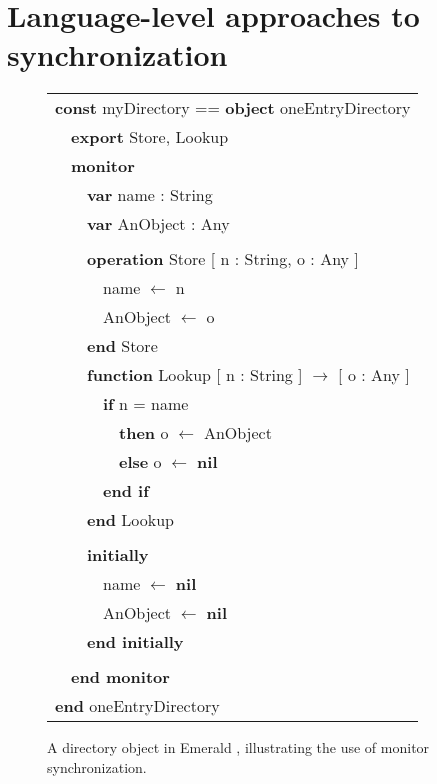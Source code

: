 \section{Language-level approaches to synchronization}
\begin{figure}
{\samepage\it\sis%
\begin{tabular}{l}%
{\bf const} myDirectory == {\bf object} oneEntryDirectory\\
~~{\bf export} Store, Lookup\\
~~{\bf monitor}\\
~~~~{\bf var} name : String\\
~~~~{\bf var} AnObject : Any\\
\\
~~~~{\bf operation} Store [ n : String, o : Any ]\\
~~~~~~name $\gets$ n\\
~~~~~~AnObject $\gets$ o\\
~~~~{\bf end} Store
\\
~~~~{\bf function} Lookup [ n : String ] $\to$ [ o : Any ]\\
~~~~~~{\bf if} n = name\\
~~~~~~~~{\bf then} o $\gets$ AnObject\\
~~~~~~~~{\bf else} o $\gets$ {\bf nil}\\
~~~~~~{\bf end if}\\
~~~~{\bf end} Lookup\\
\\
~~~~{\bf initially}\\
~~~~~~name $\gets$ {\bf nil}\\
~~~~~~AnObject $\gets$ {\bf nil}\\
~~~~{\bf end initially}\\
\\
~~{\bf end monitor}\\
{\bf end} oneEntryDirectory
\end{tabular}
}
\caption[A directory object in Emerald, illustrating the use of
 monitor synchronization.]
 {A directory object in Emerald \cite{BlackHuJuLe86},
  illustrating the use of monitor synchronization.}
\label{fig:emerald-dir}
\end{figure}

